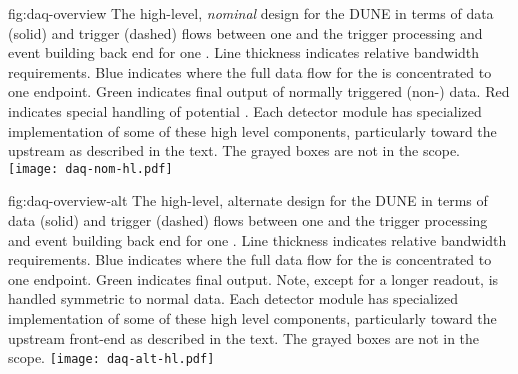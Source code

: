 \begin{dunefigure}{fig:daq-overview}
  {The high-level, \textit{nominal} design for the DUNE   in
    terms of data (solid) and trigger (dashed) flows between one
      and the trigger processing and event
    building back end for one . 
    Line thickness indicates relative bandwidth requirements.
    Blue indicates where the full data flow for the  is
    concentrated to one endpoint.
    Green indicates final output of normally triggered (non-) data.
    Red indicates special handling of potential . 
    Each detector module has specialized implementation of some of these
    high level components, particularly toward the upstream 
    as described in the text. 
    The grayed boxes are not in the  scope.
  }
  \texttt{[image: daq-nom-hl.pdf]}%
\end{dunefigure}

\begin{dunefigure}{fig:daq-overview-alt}
  {The high-level, alternate design for the DUNE   in
    terms of data (solid) and trigger (dashed) flows between one
      and the trigger processing and event
    building back end for one . 
    Line thickness indicates relative bandwidth requirements.
    Blue indicates where the full data flow for the  is
    concentrated to one endpoint.
    Green indicates final output.
    Note, except for a longer readout,  is handled
    symmetric to normal data.
    Each detector module has specialized implementation of some of
    these high level components, particularly toward the upstream
    front-end as described in the text. 
    The grayed boxes are not in the  scope.
  }
  \texttt{[image: daq-alt-hl.pdf]}%
\end{dunefigure}

